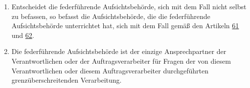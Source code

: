 \begin{enumerate}
  \item Entscheidet die federführende Aufsichtsbehörde, sich mit dem Fall nicht selbst zu befassen, so befasst die
   Aufsichtsbehörde, die die federführende Aufsichtsbehörde unterrichtet hat, sich mit dem Fall gemäß den Artikeln
   \hyperref[ch:61]{61} und \hyperref[ch:62]{62}.
  \label{itm:56-5}

  \item Die federführende Aufsichtsbehörde ist der einzige Ansprechpartner der Verantwortlichen oder der
   Auftragsverarbeiter für Fragen der von diesem Verantwortlichen oder diesem Auftragsverarbeiter durchgeführten
   grenzüberschreitenden Verarbeitung.
  \label{itm:56-6}

\end{enumerate}


